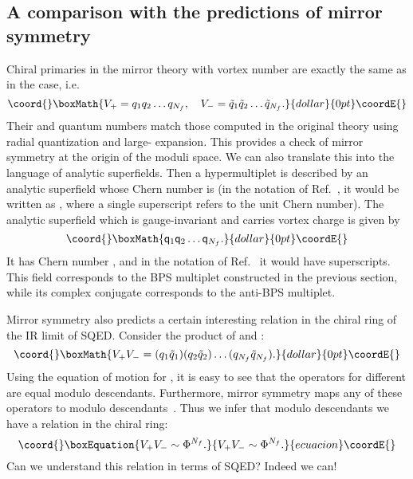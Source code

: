 \documentclass[a4paper,12pt, amsfonts, amssymb]{article}
\providecommand{\tq}{{\tilde q}}
\providecommand{\q}{{\mathsf q}}
\begin{document}
\subsection{A comparison with the predictions of \coordHE{} mirror symmetry}

Chiral primaries in the mirror theory with vortex number \coordHE{} are 
exactly the same as in the \coordHE{} case, i.e.
$$\coord{}\boxMath{
V_+=q_1 q_2\ldots q_{N_f}, \quad V_-=\tq_1\tq_2\ldots \tq_{N_f}.
}{dollar}{0pt}\coordE{}$$
Their \coordHE{} and \coordHE{} quantum numbers match those computed in
the original theory using radial quantization and large-\coordHE{} expansion.
This provides a check of \coordHE{} mirror symmetry at the origin of the
moduli space. We can also translate this into the language of analytic
superfields. Then a hypermultiplet \myHighlight{$(q_j,\tq_j^\dag)$}\coordHE{} is described
by an analytic superfield \myHighlight{$\q_j$}\coordHE{} whose Chern number is \coordHE{} (in the notation
of Ref.~\cite{HS}, it would be written as \coordHE{}, where a single \myHighlight{$+$}\coordHE{}
superscript refers to the unit Chern number). The analytic superfield which
is gauge-invariant and carries vortex charge \coordHE{} is given by
$$\coord{}\boxMath{
\q_1\q_2\ldots \q_{N_f}.
}{dollar}{0pt}\coordE{}$$
It has Chern number \coordHE{}, and in the notation of Ref.~\cite{HS} it
would have \coordHE{} superscripts. This field corresponds to the
BPS multiplet constructed in the previous section, while its complex
conjugate corresponds to the anti-BPS multiplet.

Mirror symmetry also predicts a certain interesting relation in the
chiral ring of the IR limit of \coordHE{} SQED. 
Consider the product of \coordHE{} and \coordHE{}: 
$$\coord{}\boxMath{
V_+V_-=(q_1\tq_1)(q_2\tq_2)\ldots (q_{N_f}\tq_{N_f}). 
}{dollar}{0pt}\coordE{}$$ 
Using the equation of motion for \coordHE{}, it is easy to see that the 
operators \myHighlight{$(q_j \tq_j)$}\coordHE{} for different \coordHE{} are equal modulo descendants. Furthermore, mirror symmetry maps any of these operators to \myHighlight{$\Phi$}\coordHE{} modulo descendants~\cite{five}. Thus we infer that modulo descendants we have a relation in the chiral ring:
\begin{equation}\coord{}\boxEquation{\label{rel}
V_+V_-\sim \Phi^{N_f}.
}{V_+V_-\sim \Phi^{N_f}.
}{ecuacion}\coordE{}\end{equation}
Can we understand this relation in terms of \coordHE{} SQED? Indeed we can!
\end{document}
